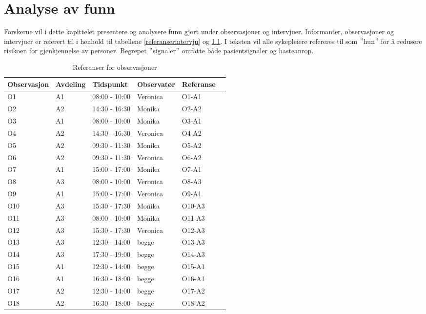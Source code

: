 \chapter{Analyse av funn}
\label{chp:analyseavfunn}
Forskerne vil i dette kapittelet presentere og analysere funn gjort under observasjoner og intervjuer. Informanter, observasjoner og intervjuer er referert til i henhold til tabellene \ref{referanserintervju} og \ref{referanserobservasjoner}. I teksten vil alle sykepleiere refereres til som $"$hun$"$ for å redusere risikoen for gjenkjennelse av personer. Begrepet $"$signaler$"$ omfatte både pasientsignaler og hasteanrop.

\begin{table}[H]\centering
    \begin{tabular}{ |l|l|l|l|l|l| }
    \hline
   \textbf{Observasjon} & \textbf{Avdeling} & \textbf{Tidspunkt} & \textbf{Observatør} & \textbf{Referanse}\\ \hline
       O1 & A1 & 08:00 - 10:00 & Veronica & O1-A1\\ \hline
       O2 & A2 & 14:30 - 16:30 & Monika & O2-A2 \\ \hline
      O3 & A1 & 08:00 - 10:00 & Monika & O3-A1 \\ \hline
       O4 & A2 & 14:30 - 16:30 & Veronica & O4-A2 \\ \hline
         O5 & A2 & 09:30 - 11:30 & Monika & O5-A2 \\ \hline
       O6 & A2 & 09:30 - 11:30 & Veronica & O6-A2 \\ \hline
      O7 & A1 & 15:00 - 17:00 & Monika & O7-A1 \\ \hline
       O8 & A3 & 08:00 - 10:00 & Veronica & O8-A3 \\ \hline
       O9 & A1 & 15:00 - 17:00 & Veronica & O9-A1 \\ \hline
       O10 & A3 & 15:30 - 17:30 & Monika & O10-A3 \\ \hline
      O11 & A3 & 08:00 - 10:00 & Monika & O11-A3 \\ \hline
       O12 & A3 & 15:30 - 17:30 & Veronica & O12-A3 \\ \hline
       O13 & A3 & 12:30 - 14:00 & begge & O13-A3 \\ \hline
       O14 & A3 & 17:30 - 19:00 & begge & O14-A3 \\ \hline
      O15 & A1 & 12:30 - 14:00 & begge & O15-A1 \\ \hline
       O16 & A1 & 16:30 - 18:00 & begge & O16-A1 \\ \hline
         O17 & A2 & 12:30 - 14:00 & begge & O17-A2 \\ \hline
       O18 & A2 & 16:30 - 18:00 & begge & O18-A2 \\ \hline
    \end{tabular}
    \caption {Referanser for observasjoner}
    \label{referanserobservasjoner}
\end{table}

